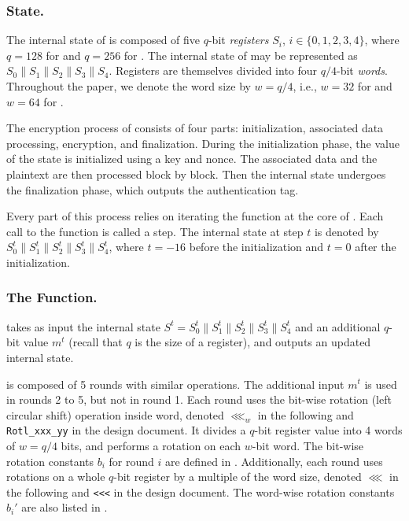 \subsubsection{State.}
The internal state of \MORUS is composed of five $q$-bit \emph{registers} $S_i$, $i \in\{0,1,2,3,4\}$, where $q = 128$ for \MORUS[640] and $q=256$ for \MORUS[1280]. The internal state of \MORUS may be represented as $S_0\|S_1\|S_2\|S_3\|S_4$.
Registers are themselves divided into four $q/4$-bit \emph{words}.
Throughout the paper, we denote the word size by $w = q/4$, i.e., $w=32$ for \MORUS[640] and $w=64$ for \MORUS[1280].

The encryption process of \MORUS consists of four parts: initialization, associated data processing, encryption, and finalization. 
During the initialization phase, the value of the state is initialized using a key and nonce.
The associated data and the plaintext are then processed block by block.
Then the internal state undergoes the finalization phase, which outputs the authentication tag.

Every part of this process relies on iterating the \StateUpdate{} function at the core of \MORUS. Each call to the \StateUpdate{} function is called a step.
The internal state at step $t$ is denoted by $S^t_0\|S^t_1\|S^t_2\|S^t_3\|S^t_4$, where $t = -16$ before the initialization and $t=0$ after the initialization.


\subsubsection{The \StateUpdate{} Function.}
\StateUpdate{} takes as input the internal state $S^t = S^t_0\|S^t_1\|S^t_2\|S^t_3\|S^t_4$ and an additional $q$-bit value $m^t$ (recall that $q$ is the size of a register), and outputs an updated internal state.

\StateUpdate{} is composed of 5 rounds with similar operations.
The additional input $m^t$ is used in rounds 2 to 5, but not in round 1.
Each round uses the bit-wise rotation (left circular shift) operation inside word,
denoted $\lll_w$ in the following and \texttt{Rotl\_xxx\_yy} in the design document.
It divides a $q$-bit register value into 4 words of $w = q/4$ bits, and performs a rotation on each $w$-bit word.
The bit-wise rotation constants $b_i$ for round $i$ are defined in .
Additionally, each round uses rotations on a whole $q$-bit register by a multiple of the word size,
denoted $\lll$ in the following and \texttt{<<<} in the design document.
The word-wise rotation constants $b_i'$ are also listed in .

